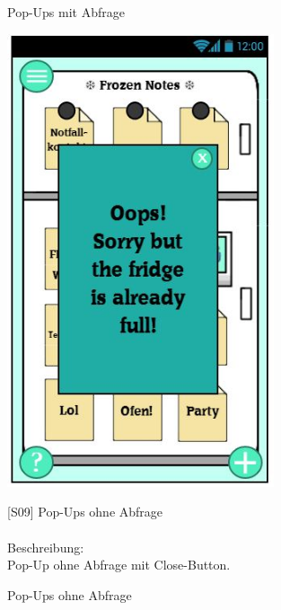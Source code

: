\documentclass[a4paper]{scrreprt}
\begin{document}
\begin{figure}[h!]
\begin{minipage}[t]{0.45\linewidth}
    			\caption{Pop-Ups mit Abfrage}
    			\label{fig:figure1}
    			
    		\end{minipage}
    	\end{figure}
    
    	\vspace{15mm}
    	
    	\begin{figure}[h!]
    		\begin{minipage}[b]{0.4\linewidth}
    			\flushright
    			\centering
    			\includegraphics[width=0.7\textwidth]{fridget_error.JPG}
    			\caption{Pop-Ups ohne Abfrage}
    			\label{fig:figure1}
    			\vspace{1mm}
    		\end{minipage}
    		\hspace{0.5cm}
    		\begin{minipage}[b]{0.55\linewidth}
    			\flushleft
    			{[}S09{]} Pop-Ups ohne Abfrage\\
    			\hfill
    			\\Beschreibung: \\
    			Pop-Up ohne Abfrage mit Close-Button.\\
    			

\end{minipage}
\end{figure}
\end{document}
